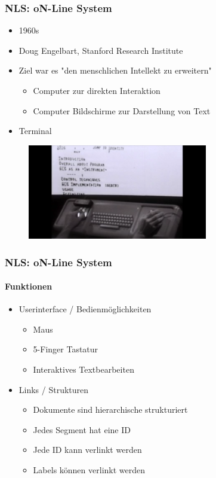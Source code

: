 \begin{frame}
\frametitle{NLS: oN-Line System}
\begin{itemize}
	\item 1960s
	\item Doug Engelbart, Stanford Research Institute
	\item Ziel war es "den menschlichen Intellekt zu erweitern"
	\begin{itemize}
		\item Computer zur direkten Interaktion
		\item Computer Bildschirme zur Darstellung von Text
	\end{itemize}
	\item Terminal
\end{itemize}

\begin{figure}[htbp]
	\centering
	\includegraphics[width=0.7\textwidth]{images/nls}
\end{figure}

\end{frame}

\begin{frame}
\frametitle{NLS: oN-Line System}
\framesubtitle{Funktionen}
	\begin{itemize}
		\item Userinterface / Bedienmöglichkeiten
		\begin{itemize}
			\item Maus
			\item 5-Finger Tastatur
			\item Interaktives Textbearbeiten
		\end{itemize}
		\item Links / Strukturen
		\begin{itemize}
			\item Dokumente sind hierarchische strukturiert
			\item Jedes Segment hat eine ID
			\item Jede ID kann verlinkt werden
			\item Labels können verlinkt werden
		\end{itemize}
	\end{itemize}
\end{frame}
